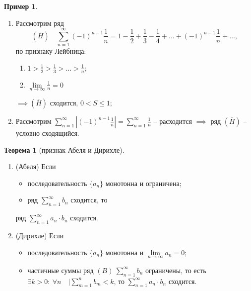 \documentclass{report}
\theoremstyle{definition}
\newtheorem{example}{Пример}
\newtheorem{theorem}{Теорема}[section]
\begin{document}
\begin{example}
  \begin{enumerate}
    \item Рассмотрим ряд
          \begin{equation*}
            (\overline{H}) \quad \sum_{n=1}^{\infty}(-1)^{n-1}\frac{1}{n} = 1 - \frac{1}{2} + \frac{1}{3} - \frac{1}{4} + \ldots + (-1)^{n-1}\frac{1}{n} + \ldots,
          \end{equation*}
          по признаку Лейбница:
          \begin{enumerate}
            \item $1 > \frac{1}{2} > \frac{1}{3} > \ldots > \frac{1}{n}$;
            \item $\underset{n\rightarrow\infty}{\lim}\frac{1}{n} = 0$
          \end{enumerate}
          $\implies (\overline{H})$ сходится, $0 < S \leqslant 1$;

    \item Рассмотрим $\sum_{n=1}^{\infty}|(-1)^{n-1}\frac{1}{n}| = \sum_{n=1}^{\infty}\frac{1}{n}$ -- расходится $\implies$ ряд $(\overline{H})$ -- условно сходящийся.
  \end{enumerate}
\end{example}

\begin{theorem}[признак Абеля и Дирихле]
  \begin{enumerate}
    \item (Абеля) Если \begin{itemize}
            \item последовательность $\{a_n\}$ монотонна и ограничена;
            \item ряд $\sum_{n=1}^{\infty} b_n$ сходится, то
          \end{itemize}
          ряд $\sum_{n=1}^{\infty}a_n \cdot b_n$ сходится.

    \item (Дирихле) Если \begin{itemize}
            \item последовательность $\{a_n\}$ монотонна и $\underset{n\rightarrow\infty}{\lim}a_n = 0$;
            \item частичные суммы ряд $(B) \ \sum_{n=1}^{\infty}b_n$ ограничены, то есть $\exists k > 0: \ \forall n \quad |\sum_{m=1}^{n} b_m < k$, то $\sum_{n=1}^{\infty}a_n \cdot b_n$ сходится.
          \end{itemize}
  \end{enumerate}
\end{theorem}
\end{document}

